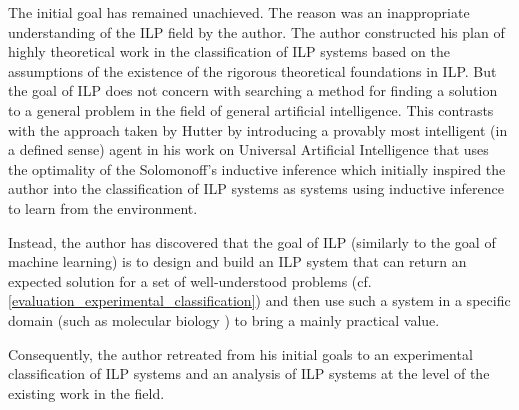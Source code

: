 The initial goal has remained unachieved. The reason was an inappropriate understanding of the ILP field by the author. The author constructed his plan of highly theoretical work in the classification of ILP systems based on the assumptions of the existence of the rigorous theoretical foundations in ILP. But the goal of ILP does not concern with searching a method for finding a solution to a general problem in the field of general artificial intelligence. This contrasts with the approach taken by Hutter by introducing a provably most intelligent (in a defined sense) agent in his work on Universal Artificial Intelligence \cite{hutter2005universal}
that uses the optimality of the Solomonoff's inductive inference 
\cite{solomonoff1964formal}\cite{legg1997solomonoff} which initially inspired the author into the classification of ILP systems as systems using inductive inference to learn from the environment.

Instead, the author has discovered that the goal of ILP (similarly to the goal of machine learning) is to design and build an ILP system that can return an expected solution for a set of well-understood problems (cf. \ref{evaluation_experimental_classification}) and then use such a system in a specific domain (such as molecular biology \cite{srinivasan1994mutagenesis}\cite{srinivasan1997carcinogenesis}) to bring a mainly practical value.

Consequently, the author retreated from his initial goals to an experimental classification of ILP systems and an analysis of ILP systems at the level of the existing work \cite{nienhuys1997foundations}\cite{muggleton1995inverse}\cite{yamamoto2012inverse} in the field.
